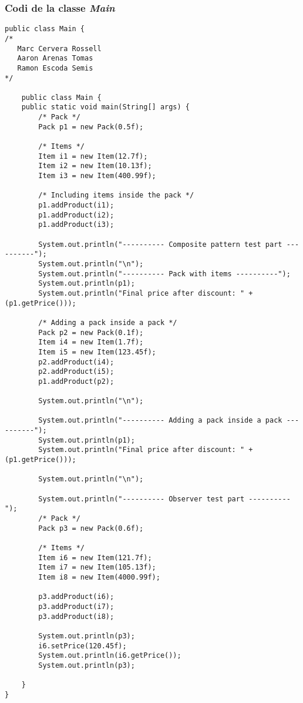 \documentclass[a4paper,12pt]{article}
\begin{document}
\subsubsection{Codi de la classe \textit{Main}}
\begin{lstlisting}
public class Main {
/* 
   Marc Cervera Rossell
   Aaron Arenas Tomas
   Ramon Escoda Semis
*/

    public class Main {
    public static void main(String[] args) {
        /* Pack */
        Pack p1 = new Pack(0.5f);

        /* Items */
        Item i1 = new Item(12.7f);
        Item i2 = new Item(10.13f);
        Item i3 = new Item(400.99f);

        /* Including items inside the pack */
        p1.addProduct(i1);
        p1.addProduct(i2);
        p1.addProduct(i3);

        System.out.println("---------- Composite pattern test part ----------");
        System.out.println("\n");
        System.out.println("---------- Pack with items ----------");
        System.out.println(p1);
        System.out.println("Final price after discount: " + (p1.getPrice()));

        /* Adding a pack inside a pack */
        Pack p2 = new Pack(0.1f);
        Item i4 = new Item(1.7f);
        Item i5 = new Item(123.45f);
        p2.addProduct(i4);
        p2.addProduct(i5);
        p1.addProduct(p2);

        System.out.println("\n");

        System.out.println("---------- Adding a pack inside a pack ----------");
        System.out.println(p1);
        System.out.println("Final price after discount: " + (p1.getPrice()));

        System.out.println("\n");

        System.out.println("---------- Observer test part ----------");
        /* Pack */
        Pack p3 = new Pack(0.6f);

        /* Items */
        Item i6 = new Item(121.7f);
        Item i7 = new Item(105.13f);
        Item i8 = new Item(4000.99f);

        p3.addProduct(i6);
        p3.addProduct(i7);
        p3.addProduct(i8);

        System.out.println(p3);
        i6.setPrice(120.45f);
        System.out.println(i6.getPrice());
        System.out.println(p3);

    }
}
\end{lstlisting}
\end{document}
